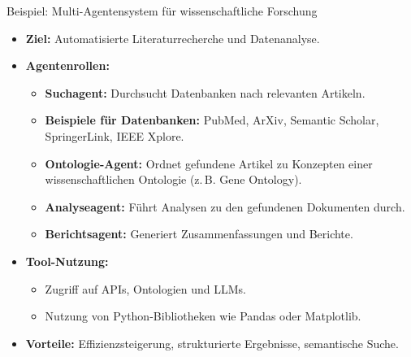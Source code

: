 \documentclass[aspectratio=1610, xcolor=dvipsnames, 9pt]{beamer}
\begin{document}
\begin{frame}{Beispiel: Multi-Agentensystem für wissenschaftliche Forschung}
  \begin{itemize}
    \item \textbf{Ziel:} Automatisierte Literaturrecherche und Datenanalyse.
    \item \textbf{Agentenrollen:}
      \begin{itemize}
        \item \textbf{Suchagent:} Durchsucht Datenbanken nach relevanten Artikeln.
        \item \textbf{Beispiele für Datenbanken:} PubMed, ArXiv, Semantic Scholar, SpringerLink, IEEE Xplore.
        \item \textbf{Ontologie-Agent:} Ordnet gefundene Artikel zu Konzepten einer wissenschaftlichen Ontologie (z. B. Gene Ontology).
        \item \textbf{Analyseagent:} Führt Analysen zu den gefundenen Dokumenten durch.
        \item \textbf{Berichtsagent:} Generiert Zusammenfassungen und Berichte.
      \end{itemize}
    \item \textbf{Tool-Nutzung:}
      \begin{itemize}
        \item Zugriff auf APIs, Ontologien und LLMs.
        \item Nutzung von Python-Bibliotheken wie Pandas oder Matplotlib.
      \end{itemize}
    \item \textbf{Vorteile:} Effizienzsteigerung, strukturierte Ergebnisse, semantische Suche.
  \end{itemize}
\end{frame}
\end{document}

